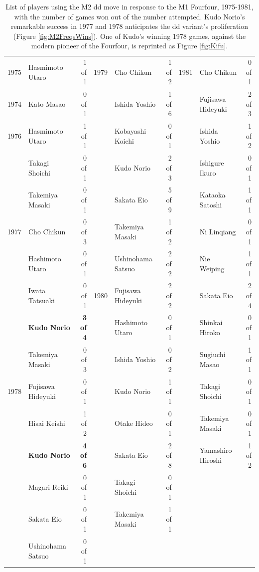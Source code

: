 \begin{table}
  \centering
  \begin{footnotesize}
    \begin{tabular}{rlr|rlr|rlr}
    \hline
	\hline
    1975  & Hasmimoto Utaro & 1 of 1 & 1979  & Cho Chikun & 1 of 2 & 1981  & Cho Chikun & 0 of 1 \\
    1974  & Kato Masao & 0 of 1 &       & Ishida Yoshio & 1 of 6 &       & Fujisawa Hideyuki & 2 of 3 \\
    1976  & Hasmimoto Utaro & 1 of 1 &       & Kobayashi Koichi & 0 of 1 &       & Ishida Yoshio & 1 of 2 \\
          & Takagi Shoichi & 0 of 1 &       & Kudo Norio & 2 of 3 &       & Ishigure Ikuro & 0 of 1 \\
          & Takemiya Masaki  & 0 of 1 &       & Sakata Eio & 5 of 9 &       & Kataoka Satoshi & 1 of 1 \\
    1977  & Cho Chikun & 0 of 3 &       & Takemiya Masaki  & 1 of 2 &       & Ni Linqiang & 0 of 1 \\
          & Hashimoto Utaro & 0 of 1 &       & Ushinohama Satsuo & 2 of 2 &       & Nie Weiping  & 1 of 1 \\
          & Iwata Tatsuaki & 0 of 1 & 1980  & Fujisawa Hideyuki & 2 of 2 &       & Sakata Eio & 2 of 4 \\
          & \textbf{Kudo Norio} & \textbf{3 of 4} &       & Hashimoto Utaro & 0 of 1 &       & Shinkai Hiroko & 0 of 1 \\
          & Takemiya Masaki  & 0 of 3 &       & Ishida Yoshio & 0 of 2 &       & Sugiuchi Masao & 1 of 1 \\
    1978  & Fujisawa Hideyuki & 0 of 1 &       & Kudo Norio & 1 of 1 &       & Takagi Shoichi & 0 of 1 \\
          & Hisai Keishi & 1 of 2 &       & Otake Hideo & 0 of 1 &       & Takemiya Masaki  & 0 of 1 \\
          & \textbf{Kudo Norio} & \textbf{4 of 6} &       & Sakata Eio & 2 of 8 &       & Yamashiro Hiroshi & 1 of 2 \\
          & Magari Reiki & 0 of 1 &       & Takagi Shoichi & 0 of 1 &       &       &  \\
          & Sakata Eio & 0 of 1 &       & Takemiya Masaki  & 1 of 1 &       &       &  \\
          & Ushinohama Satsuo & 0 of 1 &       &       &       &       &       &  \\
    \hline
    \end{tabular}%
	\caption{List of players using the M2 dd move in response to the M1 Fourfour, 1975-1981, with the number of games won out of the number attempted.  Kudo Norio's remarkable success in 1977 and 1978 anticipates the dd variant's proliferation (Figure \ref{fig:M2FreqsWins}).  One of Kudo's winning 1978 games, against the modern pioneer of the Fourfour, is reprinted as Figure \ref{fig:Kifu}.}
	\label{tab:M2dd}%
	\end{footnotesize}
\end{table}%



